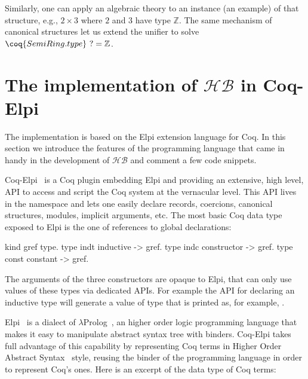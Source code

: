 \documentclass[a4paper,UKenglish,cleveref, autoref]{lipics-v2019}
\newcommand{\HB}{\ensuremath{\mathcal{HB}}}
\theoremstyle{implem}
\theoremstyle{implem}
\theoremstyle{command}
\theoremstyle{commands}
\begin{document}
Similarly, one can apply an algebraic theory to an instance (an example) of that structure, e.g., \(2 \times 3\) where \(2\) and \(3\) have type \(\mathbb{Z}\).
The same mechanism of canonical structures let us extend the unifier to solve \(\coq{SemiRing.type}~? = \mathbb{Z}\).


\section{The implementation of \HB{} in Coq-Elpi}\label{sec:implementation}

The implementation is based on the Elpi
extension language for Coq. In this section we introduce the features of the
programming language that came in handy in the development of \HB{} and
comment a few code snippets.

Coq-Elpi~\cite{CoqElpi} is a Coq plugin embedding
Elpi and providing an
extensive, high level, API to access and script the Coq system at the
vernacular level.
This API lives in the  namespace and lets one easily declare
records, coercions, canonical structures, modules, implicit arguments, etc.
The most basic Coq data type exposed to Elpi is the one of references to global
declarations:

\begin{elpicode}
kind gref  type.                 %
type indt  inductive -> gref.    %
type indc  constructor -> gref.  %
type const constant -> gref.     %
\end{elpicode}

The arguments of the three constructors are opaque to Elpi, that can only use
values of these types via dedicated APIs. For example the API for declaring
an inductive type will generate a value of type  that
is printed as, for example, .

Elpi~\cite{DBLP:conf/lpar/DunchevGCT15} is a dialect
of $\lambda$Prolog~\cite{Miller:2012:PHL:2331097}, an higher order
logic programming language that makes it easy to manipulate abstract syntax
tree with binders. Coq-Elpi takes full advantage of this capability by
representing Coq terms in Higher Order Abstract
Syntax~\cite{10.1145/53990.54010} style, reusing the binder of the programming
language in order to represent Coq's ones. Here is an excerpt of the data
type of Coq terms:
\end{document}
